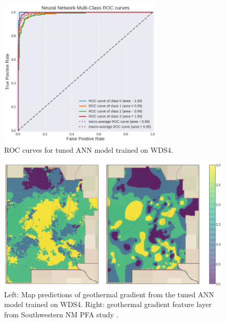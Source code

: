 \begin{figure}[htp]
\centering
\includegraphics[width=0.7\textwidth]{templates/images/Figure-NN-AUC.png}
\caption[Neural network ROC curves]{ROC curves for tuned ANN model trained on WDS4.}
\label{fig:nn_auc}
\end{figure}

\begin{figure}[!htp]
\centering
\includegraphics[width=\textwidth]{templates/images/Figure-NN-FinalMap_Joint.png}
\caption[Neural network final map]{Left: Map predictions of geothermal gradient from the tuned ANN model trained on WDS4. Right: geothermal gradient feature layer from Southwestern NM PFA study \protect\citep{bielicki_hydrogeolgic_2015}.}
\label{fig:nn_final_map}
\end{figure}

